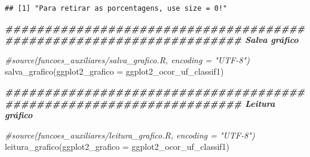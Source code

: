 \documentclass[
]{article}
\newenvironment{Shaded}{\begin{snugshade}}{\end{snugshade}}
\newcommand{\AttributeTok}[1]{\textcolor[rgb]{0.77,0.63,0.00}{#1}}
\newcommand{\CommentTok}[1]{\textcolor[rgb]{0.56,0.35,0.01}{\textit{#1}}}
\newcommand{\ConstantTok}[1]{\textcolor[rgb]{0.00,0.00,0.00}{#1}}
\newcommand{\DecValTok}[1]{\textcolor[rgb]{0.00,0.00,0.81}{#1}}
\newcommand{\DocumentationTok}[1]{\textcolor[rgb]{0.56,0.35,0.01}{\textbf{\textit{#1}}}}
\newcommand{\FloatTok}[1]{\textcolor[rgb]{0.00,0.00,0.81}{#1}}
\newcommand{\FunctionTok}[1]{\textcolor[rgb]{0.00,0.00,0.00}{#1}}
\newcommand{\NormalTok}[1]{#1}
\newcommand{\OtherTok}[1]{\textcolor[rgb]{0.56,0.35,0.01}{#1}}
\newcommand{\SpecialCharTok}[1]{\textcolor[rgb]{0.00,0.00,0.00}{#1}}
\newcommand{\StringTok}[1]{\textcolor[rgb]{0.31,0.60,0.02}{#1}}
\begin{document}
\begin{Shaded}
\end{Shaded}

\begin{verbatim}
## [1] "Para retirar as porcentagens, use size = 0!"
\end{verbatim}

\begin{Shaded}
\begin{Highlighting}[]
\DocumentationTok{\#\#\#\#\#\#\#\#\#\#\#\#\#\#\#\#\#\#\#\#\#\#\#\#\#\#\#\#\#\#\#\#\#\#\#\#\#\#\#\#\#\#\#\#\#\#\#\#\#\#\#\#\#\#\#\#\#\#\#\#\#\#\#\#\#\#\#\# Salva gráfico}

\CommentTok{\#source(\textquotesingle{}funcoes\_auxiliares/salva\_grafico.R\textquotesingle{}, encoding = "UTF{-}8")}
\FunctionTok{salva\_grafico}\NormalTok{(}\AttributeTok{ggplot2\_grafico =}\NormalTok{ ggplot2\_ocor\_uf\_classif1)}

\DocumentationTok{\#\#\#\#\#\#\#\#\#\#\#\#\#\#\#\#\#\#\#\#\#\#\#\#\#\#\#\#\#\#\#\#\#\#\#\#\#\#\#\#\#\#\#\#\#\#\#\#\#\#\#\#\#\#\#\#\#\#\#\#\#\#\#\#\#\#\#\# Leitura gráfico}

\CommentTok{\#source(\textquotesingle{}funcoes\_auxiliares/leitura\_grafico.R\textquotesingle{}, encoding = "UTF{-}8")}
\FunctionTok{leitura\_grafico}\NormalTok{(}\AttributeTok{ggplot2\_grafico =}\NormalTok{ ggplot2\_ocor\_uf\_classif1)}
\end{Highlighting}
\end{Shaded}
\end{document}
